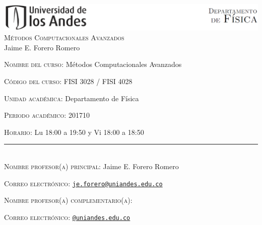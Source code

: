 \documentclass[letterpaper,10pt,onecolumn]{article}
\begin{document}
\begin{center}

\includegraphics[width=490pt]{header.png}\\[0.5cm]

\textsc{\LARGE M\'etodos Computacionales Avanzados}\\[0.1cm]

\large Jaime E. Forero Romero\\[0.5cm]

\end{center}

\large \noindent\textsc{Nombre del curso:}  M\'etodos Computacionales
Avanzados%
  
\noindent\textsc{C\'odigo del curso:} FISI 3028 / FISI 4028 %

\noindent\textsc{Unidad acad\'emica:} Departamento de F\'isica

\noindent\textsc{Periodo acad\'emico:} 201710 %

\noindent\textsc{Horario:} Lu 18:00 a 19:50 y Vi 18:00 a 18:50 %

\noindent\rule{\textwidth}{1pt}\\[-0.3cm]

\normalsize \noindent\textsc{Nombre profesor(a) principal:} Jaime
E. Forero Romero%

\noindent\textsc{Correo electr\'onico:}
\href{mailto:je.forero@uniandes.edu.co}{\nolinkurl{je.forero@uniandes.edu.co}}


\noindent\textsc{Nombre profesor(a) complementario(a):} %

\noindent\textsc{Correo electr\'onico:}
\href{mailto:@uniandes.edu.co}{\nolinkurl{@uniandes.edu.co}}
\end{document}
